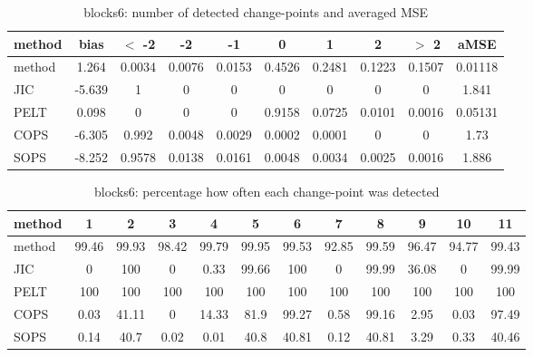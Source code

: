 \begin{table}[ht]
\centering
\begin{tabular}{l|c|ccccccc|c}
  \hline
method & bias & $<$ -2 & -2 & -1 & 0 & 1 & 2 & $>$ 2 & aMSE \\ 
  \hline
method & 1.264 & 0.0034 & 0.0076 & 0.0153 & 0.4526 & 0.2481 & 0.1223 & 0.1507 & 0.01118 \\ 
  JIC & -5.639 &     1 &     0 &     0 &     0 &     0 &     0 &     0 & 1.841 \\ 
  PELT & 0.098 &     0 &     0 &     0 & 0.9158 & 0.0725 & 0.0101 & 0.0016 & 0.05131 \\ 
  COPS & -6.305 & 0.992 & 0.0048 & 0.0029 & 0.0002 & 0.0001 &     0 &     0 &  1.73 \\ 
  SOPS & -8.252 & 0.9578 & 0.0138 & 0.0161 & 0.0048 & 0.0034 & 0.0025 & 0.0016 & 1.886 \\ 
   \hline
\end{tabular}
\caption{blocks6: number of detected change-points and averaged MSE} 
\label{tab:blocks6Njumps}
\end{table}
\begin{table}[ht]
\centering
\begin{tabular}{l|ccccccccccc}
  \hline
method & 1 & 2 & 3 & 4 & 5 & 6 & 7 & 8 & 9 & 10 & 11 \\ 
  \hline
method &  99.46 &  99.93 &  98.42 &  99.79 &  99.95 &  99.53 &  92.85 &  99.59 &  96.47 &  94.77 &  99.43 \\ 
  JIC &      0 &    100 &      0 &   0.33 &  99.66 &    100 &      0 &  99.99 &  36.08 &      0 &  99.99 \\ 
  PELT &    100 &    100 &    100 &    100 &    100 &    100 &    100 &    100 &    100 &    100 &    100 \\ 
  COPS &   0.03 &  41.11 &      0 &  14.33 &   81.9 &  99.27 &   0.58 &  99.16 &   2.95 &   0.03 &  97.49 \\ 
  SOPS &   0.14 &   40.7 &   0.02 &   0.01 &   40.8 &  40.81 &   0.12 &  40.81 &   3.29 &   0.33 &  40.46 \\ 
   \hline
\end{tabular}
\caption{blocks6: percentage how often each change-point was detected} 
\label{tab:blocks6Detections}
\end{table}
